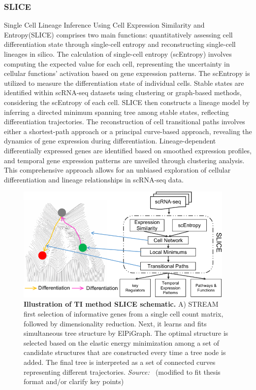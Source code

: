 \subsubsection{SLICE} 
Single Cell Lineage Inference Using Cell Expression Similarity and Entropy(SLICE)\citep{guo2017slice} comprises two main functions: quantitatively assessing cell differentiation state through single-cell entropy and reconstructing single-cell lineages in silico. The calculation of single-cell entropy (scEntropy) involves computing the expected value for each cell, representing the uncertainty in cellular functions' activation based on gene expression patterns. The scEntropy is utilized to measure the differentiation state of individual cells. Stable states are identified within scRNA-seq datasets using clustering or graph-based methods, considering the scEntropy of each cell. SLICE then constructs a lineage model by inferring a directed minimum spanning tree among stable states, reflecting differentiation trajectories. The reconstruction of cell transitional paths involves either a shortest-path approach or a principal curve-based approach, revealing the dynamics of gene expression during differentiation. Lineage-dependent differentially expressed genes are identified based on smoothed expression profiles, and temporal gene expression patterns are unveiled through clustering analysis. This comprehensive approach allows for an unbiased exploration of cellular differentiation and lineage relationships in scRNA-seq data.
\begin{figure}[ht!]
	\centering
	\includegraphics[width=0.95\textwidth]{TI_Alg_SLICE/fig}
	\vspace{0.1cm}
	\caption[Illustration of TI method SLICE schematic.]{\textbf{Illustration of TI method SLICE schematic.} 
	A)  STREAM first selection of informative genes from a single cell count matrix, followed by dimensionality reduction. Next, it learns and fits simultaneous tree structure by ElPiGraph. The optimal structure is selected based on the elastic energy minimization among a set of candidate structures that are constructed every time a tree node is added. The final tree is interpreted as a set of connected curves representing different trajectories. \emph{Source: ~\cite{guo2017slice}}(modified to fit thesis format and/or clarify key points)
	}
	\label{fig:TI_Alg_SLICE}
\end{figure}


